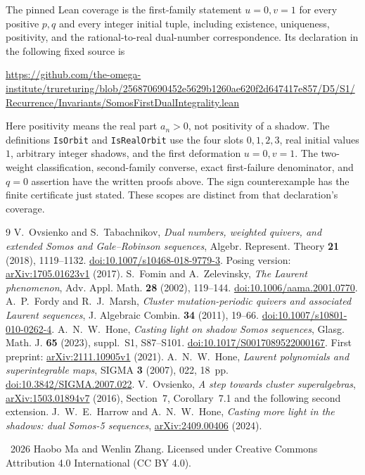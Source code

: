 \documentclass[11pt]{article}
\begin{document}
The pinned Lean coverage is the first-family statement
$u=0,v=1$ for every positive $p,q$ and every integer initial tuple,
including existence, uniqueness, positivity, and the rational-to-real
dual-number correspondence. Its declaration in the following fixed source is
\begin{center}\small
{}
\end{center}
\begin{center}\footnotesize
\url{https://github.com/the-omega-institute/trureturing/blob/256870690452e5629b1260ae620f2d647417e857/D5/S1/Recurrence/Invariants/SomosFirstDualIntegrality.lean}
\end{center}
Here positivity means the real part $a_n>0$, not positivity of a
shadow. The definitions \texttt{IsOrbit} and \texttt{IsRealOrbit} use
the four slots $0,1,2,3$, real initial values $1$, arbitrary integer
shadows, and the first deformation $u=0,v=1$.
The two-weight classification, second-family converse, exact
first-failure denominator, and $q=0$ assertion have the written proofs
above. The sign counterexample has the finite certificate just stated.
These scopes are distinct from that declaration's coverage.

\small
\begin{thebibliography}{9}
 V.~Ovsienko and S.~Tabachnikov,
\emph{Dual numbers, weighted quivers, and extended Somos and Gale--Robinson sequences},
Algebr. Represent. Theory \textbf{21} (2018), 1119--1132.
\href{https://doi.org/10.1007/s10468-018-9779-3}{doi:10.1007/s10468-018-9779-3}.
Posing version: \href{https://arxiv.org/abs/1705.01623v1}{arXiv:1705.01623v1} (2017).
 S.~Fomin and A.~Zelevinsky,
\emph{The Laurent phenomenon}, Adv. Appl. Math. \textbf{28} (2002), 119--144.
\href{https://doi.org/10.1006/aama.2001.0770}{doi:10.1006/aama.2001.0770}.
 A.~P.~Fordy and R.~J.~Marsh,
\emph{Cluster mutation-periodic quivers and associated Laurent sequences},
J. Algebraic Combin. \textbf{34} (2011), 19--66.
\href{https://doi.org/10.1007/s10801-010-0262-4}{doi:10.1007/s10801-010-0262-4}.
 A.~N.~W.~Hone,
\emph{Casting light on shadow Somos sequences},
Glasg. Math. J. \textbf{65} (2023), suppl.~S1, S87--S101.
\href{https://doi.org/10.1017/S0017089522000167}{doi:10.1017/S0017089522000167}.
First preprint: \href{https://arxiv.org/abs/2111.10905v1}{arXiv:2111.10905v1} (2021).
 A.~N.~W.~Hone,
\emph{Laurent polynomials and superintegrable maps},
SIGMA \textbf{3} (2007), 022, 18~pp.
\href{https://doi.org/10.3842/SIGMA.2007.022}{doi:10.3842/SIGMA.2007.022}.
 V.~Ovsienko,
\emph{A step towards cluster superalgebras},
\href{https://arxiv.org/abs/1503.01894v7}{arXiv:1503.01894v7} (2016),
Section~7, Corollary~7.1 and the following second extension.
 J.~W.~E.~Harrow and A.~N.~W.~Hone,
\emph{Casting more light in the shadows: dual Somos-5 sequences},
\href{https://arxiv.org/abs/2409.00406}{arXiv:2409.00406} (2024).
\end{thebibliography}
\medskip\noindent\small
\textcopyright\ 2026 Haobo Ma and Wenlin Zhang.
Licensed under Creative Commons Attribution 4.0 International (CC BY 4.0).
\end{document}
